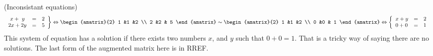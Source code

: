 \begin{example} (Inconsistant equations)
 \begin{eqnarray*}
   \left.
\begin{array}{lcr}
	\ x + \ y & = & 2 \\
	2x + 2y & = &  5
     \end{array}
   \right\} 
   \Leftrightarrow
\begin{amatrix}{2}
1 &1 &2 \\ 2 &2 & 5
\end{amatrix}
\sim
\begin{amatrix}{2}
1 &1 &2 \\ 0 &0 & 1
\end{amatrix}
\Leftrightarrow
\left\{
\begin{array}{lcr}
	x + y & = & 2 \\
	 0 + 0 & = &  1
     \end{array}
   \right.
\end{eqnarray*}  
This system of equation has a solution if there exists two numbers $x$, and $y$ such that $0+0=1$. That is a tricky way of saying there are no solutions. The last form of the augmented matrix here is in RREF.
\end{example}


